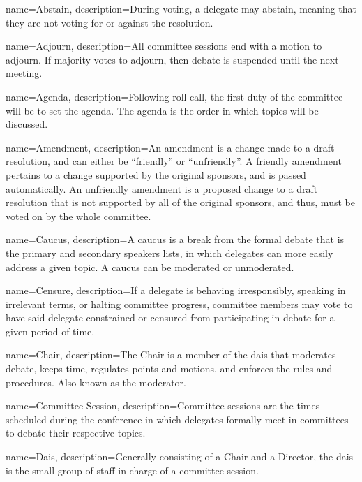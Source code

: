 \makeglossaries

{
        name={Abstain},
        description={During voting, a delegate may abstain, meaning that they are not voting for or against the resolution.}
}
 
{
        name={Adjourn},
        description={All committee sessions end with a motion to adjourn. If majority votes to adjourn, then debate is suspended until the next meeting.}
}

{
        name={Agenda},
        description={Following roll call, the first duty of the committee will be to set the agenda. The agenda is the order in which topics will be discussed.}
}

{
	name={Amendment},
	description={An amendment is a change made to a draft resolution, and can either be ``friendly'' or ``unfriendly''. A friendly amendment pertains to a change supported by the original sponsors, and is passed automatically. An unfriendly amendment is a proposed change to a draft resolution that is not supported by all of the original sponsors, and thus, must be voted on by the whole committee.}
}

{
	name={Caucus},
	description={A caucus is a break from the formal debate that is the primary and secondary speakers lists, in which delegates can more easily address a given topic. A caucus can be moderated or unmoderated.}
}

{
	name={Censure},
	description={If a delegate is behaving irresponsibly, speaking in irrelevant terms, or halting committee progress, committee members may vote to have said delegate constrained or censured from participating in debate for a given period of time.}
}

{
	name={Chair},
	description={The Chair is a member of the dais that moderates debate, keeps time, regulates points and motions, and enforces the rules and procedures. Also known as the moderator.}
}


{
	name={Committee Session},
	description={Committee sessions are the times scheduled during the conference in which delegates formally meet in committees to debate their respective topics.}
}

{
	name={Dais},
	description={Generally consisting of a Chair and a Director, the dais is the small group of staff in charge of a committee session.}
}

